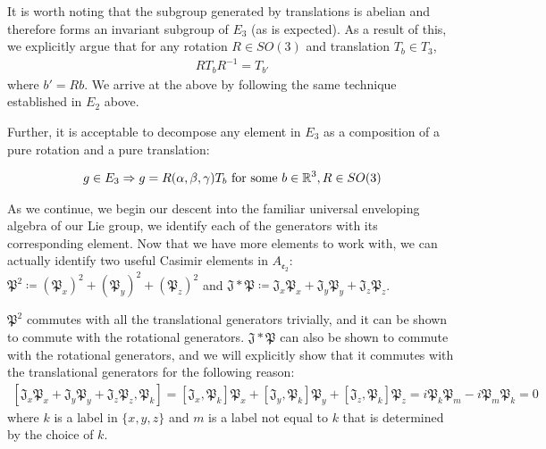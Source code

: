 It is worth noting that the subgroup generated by translations is abelian and therefore forms an invariant subgroup of $E_3$ (as is expected). As a result of this, we explicitly argue that for any rotation $R\in SO(3)$ and translation $T_b\in T_3$,
\begin{equation}
\begin{aligned}
	RT_bR^{-1} = T_{b'}
\end{aligned}
\end{equation}
where $b' = Rb$. We arrive at the above by following the same technique established in $E_2$ above.

Further, it is acceptable to decompose any element in $E_3$ as a composition of a pure rotation and a pure translation:

\begin{equation}
\begin{aligned}
	g\in E_3 \Rightarrow g = R(\alpha,\beta,\gamma)T_b\text{ for some } b\in\mathbb{R}^3, R\in SO(3)
\end{aligned}
\end{equation}

As we continue, we begin our descent into the familiar universal enveloping algebra of our Lie group, we identify each of the generators with its corresponding element. Now that we have more elements to work with, we can actually identify two useful Casimir elements in $A_\mathfrak{e_2}$: $\mathfrak{P^2}\coloneq (\mathfrak{P}_x)^2 + (\mathfrak{P}_y)^2 + (\mathfrak{P}_z)^2$ and $\mathfrak{J}* \mathfrak{P} \coloneq \mathfrak{J}_x\mathfrak{P}_x +\mathfrak{J}_y\mathfrak{P}_y + \mathfrak{J}_z\mathfrak{P}_z$.

$\mathfrak{P^2}$ commutes with all the translational generators trivially, and it can be shown to commute with the rotational generators.
$\mathfrak{J}*\mathfrak{P}$ can also be shown to commute with the rotational generators, and we will explicitly show that it commutes with the translational generators for the following reason:
\begin{equation}
\begin{aligned}
 [\mathfrak{J}_x\mathfrak{P}_x+\mathfrak{J}_y\mathfrak{P}_y+\mathfrak{J}_z\mathfrak{P}_z, \mathfrak{P}_k] = [\mathfrak{J}_x,\mathfrak{P}_k]\mathfrak{P}_x + [\mathfrak{J}_y,\mathfrak{P}_k]\mathfrak{P}_y + [\mathfrak{J}_z,\mathfrak{P}_k]\mathfrak{P}_z = i\mathfrak{P}_k\mathfrak{P}_m-i\mathfrak{P}_m\mathfrak{P}_k = 0
\end{aligned}
\end{equation}
where $k$ is a label in $\{x,y,z\}$ and $m$ is a label not equal to $k$ that is determined by the choice of $k$.

